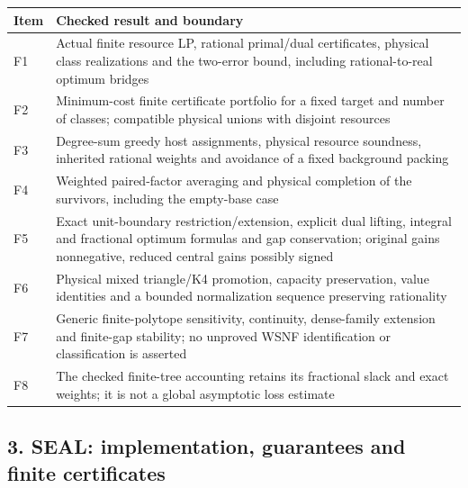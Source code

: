 \documentclass[english,11pt,a4paper]{article}
\newcounter{none}
\begin{document}
{\def\LTcaptype{none} %
\begin{longtable}[]{@{}
  >{\raggedright\arraybackslash}p{}
  >{\raggedright\arraybackslash}p{}@{}}
\toprule\noalign{}
\begin{minipage}[b]{\linewidth}\raggedright
Item
\end{minipage} & \begin{minipage}[b]{\linewidth}\raggedright
Checked result and boundary
\end{minipage} \\
\midrule\noalign{}
\endhead
\bottomrule\noalign{}
\endlastfoot
F1 & Actual finite resource LP, rational primal/dual certificates,
physical class realizations and the two-error bound, including
rational-to-real optimum bridges \\
F2 & Minimum-cost finite certificate portfolio for a fixed target and
number of classes; compatible physical unions with disjoint resources \\
F3 & Degree-sum greedy host assignments, physical resource soundness,
inherited rational weights and avoidance of a fixed background
packing \\
F4 & Weighted paired-factor averaging and physical completion of the
survivors, including the empty-base case \\
F5 & Exact unit-boundary restriction/extension, explicit dual lifting,
integral and fractional optimum formulas and gap conservation; original
gains nonnegative, reduced central gains possibly signed \\
F6 & Physical mixed triangle/K4 promotion, capacity preservation, value
identities and a bounded normalization sequence preserving
rationality \\
F7 & Generic finite-polytope sensitivity, continuity, dense-family
extension and finite-gap stability; no unproved WSNF identification or
classification is asserted \\
F8 & The checked finite-tree accounting retains its fractional slack and
exact weights; it is not a global asymptotic loss estimate \\
\end{longtable}
}

\subsection{3. SEAL: implementation, guarantees and finite
certificates}\label{seal-implementation-guarantees-and-finite-certificates}
\end{document}
